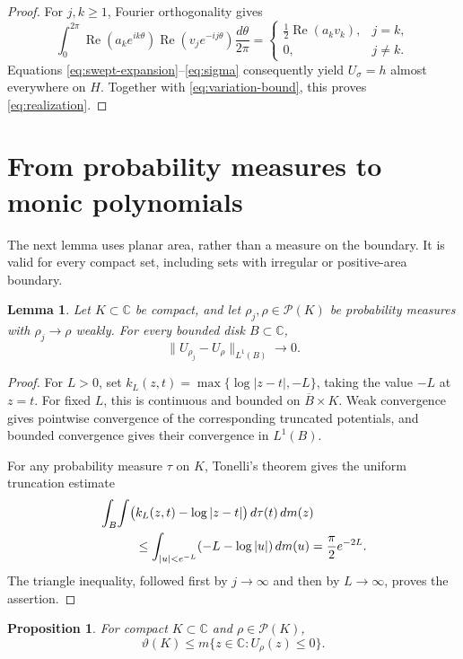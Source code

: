 \documentclass[11pt]{article}
\newcommand{\C}{\mathbb C}
\DeclareMathOperator{\Rea}{Re}
\newcommand{\Prob}{\mathcal P}
\newtheorem{lemma}[theorem]{Lemma}
\newtheorem{proposition}[theorem]{Proposition}
\theoremstyle{remark}
\numberwithin{equation}{section}
\begin{document}
\begin{proof}
For $j,k\ge1$, Fourier orthogonality gives
\[
 \int_0^{2\pi}\Rea(a_ke^{ik\theta})
            \Rea(v_je^{-ij\theta})\frac{d\theta}{2\pi}
 =\begin{cases}
   \tfrac12\Rea(a_kv_k),&j=k,\\
   0,&j\ne k.
  \end{cases}
\]
Equations \eqref{eq:swept-expansion}--\eqref{eq:sigma} consequently
yield $U_\sigma=h$ almost everywhere on $H$. Together with
\eqref{eq:variation-bound}, this proves \eqref{eq:realization}.
\end{proof}

\section{From probability measures to monic polynomials}
\label{sec:discretization}

The next lemma uses planar area, rather than a measure on the boundary.
It is valid for every compact set, including sets with irregular or
positive-area boundary.

\begin{lemma}\label{lem:L1}
Let $K\subset\C$ be compact, and let $\rho_j,\rho\in\Prob(K)$
be probability measures with $\rho_j\to\rho$ weakly. For every
bounded disk $B\subset\C$,
\[
 \|U_{\rho_j}-U_\rho\|_{L^1(B)}\longrightarrow0.
\]
\end{lemma}

\begin{proof}
For $L>0$, set
$k_L(z,t)=\max\{\log|z-t|,-L\}$, taking the value $-L$ at $z=t$.
For fixed $L$, this is continuous and bounded on $\overline B\times K$.
Weak convergence gives pointwise convergence of the corresponding
truncated potentials, and bounded convergence gives their convergence
in $L^1(B)$.

For any probability measure $\tau$ on $K$, Tonelli's theorem gives
the uniform truncation estimate
\begin{align}
 &\int_B\!\int
       \bigl(k_L(z,t)-\log|z-t|\bigr)\,d\tau(t)\,dm(z)\notag\\
 &\hspace{1cm}\le
   \int_{|u|<e^{-L}}(-L-\log|u|)\,dm(u)
   =\frac{\pi}{2}e^{-2L}.\label{eq:tail}
\end{align}
The triangle inequality, followed first by $j\to\infty$ and then
by $L\to\infty$, proves the assertion.
\end{proof}

\begin{proposition}\label{prop:discrete}
For compact $K\subset\C$ and $\rho\in\Prob(K)$,
\begin{equation}\label{eq:discrete-area}
 \vartheta(K)\le m\{z\in\C:U_\rho(z)\le0\}.
\end{equation}
\end{proposition}
\end{document}

